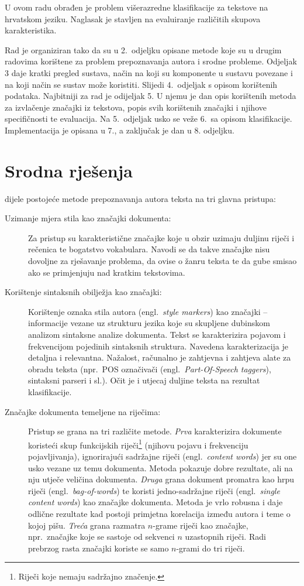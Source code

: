\documentclass{article}
\newcommand{\engl}[1]{(engl.~\emph{#1})}
\begin{document}
U ovom radu obrađen je problem višerazredne klasifikacije za tekstove na
hrvatskom jeziku. Naglasak je stavljen na evaluiranje različitih skupova
karakteristika.

Rad je organiziran tako da su u 2.~odjeljku opisane metode koje su u drugim
radovima korištene za problem prepoznavanja autora i srodne probleme. Odjeljak 3
daje kratki pregled sustava, način na koji su komponente u sustavu povezane i na
koji način se sustav može koristiti. Slijedi 4.~odjeljak s opisom korištenih
podataka. Najbitniji za rad je odijeljak 5. U njemu je dan opis korištenih
metoda za izvlačenje značajki iz tekstova, popis svih korištenih značajki i
njihove specifičnosti te evaluacija. Na 5.~odjeljak usko se veže 6.~sa
opisom klasifikacije. Implementacija je opisana u 7., a zaključak je
dan u 8. odjeljku.

\newpage

\section{Srodna rješenja}
\citet{coyotl2006authorship} dijele postojeće metode prepoznavanja autora
teksta na tri glavna pristupa:
\begin{description}
\item[Uzimanje mjera stila kao značajki dokumenta:] Za pristup su
karakteristične značajke koje u obzir uzimaju duljinu riječi i rečenica te
bogatstvo vokabulara. Navodi se da takve značajke nisu dovoljne za rješavanje
problema, da ovise o žanru teksta te da gube smisao ako se primjenjuju nad
kratkim tekstovima.
\item[Korištenje sintaksnih obilježja kao značajki:] Korištenje oznaka stila
autora \engl{style markers} kao značajki -- informacije vezane uz strukturu
jezika koje su skupljene dubinskom analizom sintaksne analize dokumenta. Tekst se
karakterizira pojavom i frekvencijom pojedinih sintaksnih struktura. Navedena
karakterizacija je detaljna i relevantna. Nažalost, računalno je zahtjevna i
zahtjeva alate za obradu teksta (npr.~POS označivači \engl{Part-Of-Speech taggers},
sintaksni parseri i sl.). Očit je i utjecaj duljine teksta na rezultat klasifikacije.
\item[Značajke dokumenta temeljene na riječima:] Pristup se grana na tri
različite metode. \emph{Prva} karakterizira dokumente koristeći skup funkcijskih
riječi\footnote{Riječi koje nemaju sadržajno značenje.} (njihovu pojavu i
frekvenciju pojavljivanja), ignorirajući sadržajne riječi \engl{content words}
jer su one usko vezane uz temu dokumenta. Metoda pokazuje dobre rezultate, ali na
nju utječe veličina dokumenta. \emph{Druga} grana dokument promatra kao hrpu
riječi \engl{bag-of-words} te koristi jedno-sadržajne riječi \engl{single
content words} kao značajke dokumenta. Metoda je vrlo robusna i daje odlične rezultate
kad postoji primjetna korelacija između autora i teme o kojoj pišu. \emph{Treća}
grana razmatra $n$-grame riječi kao značajke, npr.~značajke koje se sastoje od
sekvenci $n$ uzastopnih riječi. Radi prebrzog rasta značajki koriste se samo
$n$-grami do tri riječi.
\end{description}
\end{document}
